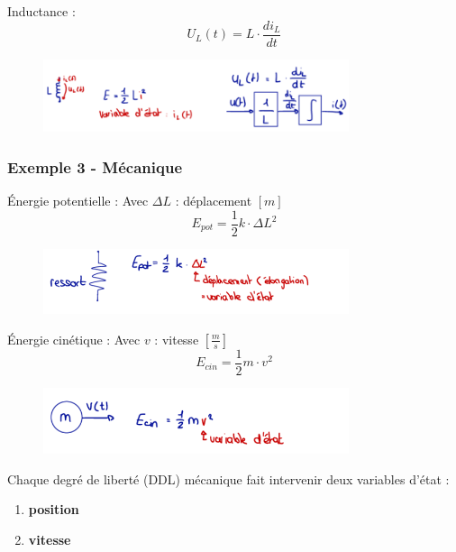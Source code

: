 \documentclass[document.tex]{subfiles}
\begin{document}
Inductance :
\begin{equation}
	U_L(t) = L \cdot \frac{di_L}{dt}
\end{equation}
\begin{figure}[H]
    \centering
    \includegraphics[width=0.8\textwidth]{Include/Figure/5.png}
\end{figure}

\subsubsection{Exemple 3 - Mécanique}

Énergie potentielle : \hfill Avec $\Delta L$ : déplacement $[m]$
\begin{equation}
 	E_{pot}=\frac{1}{2}k \cdot \Delta L^2 
\end{equation}
\begin{figure}[H]
    \centering
    \includegraphics[width=0.8\textwidth]{Include/Figure/6.png}
\end{figure}

Énergie cinétique :	\hfill Avec $v$ : vitesse $[\frac{m}{s}]$
\begin{equation}
	E_{cin}=\frac{1}{2}m \cdot v^2
\end{equation}
\begin{figure}[H]
    \centering
    \includegraphics[width=0.8\textwidth]{Include/Figure/7.png}
\end{figure}

Chaque degré de liberté (DDL) mécanique fait intervenir deux variables
d'état :
\begin{enumerate}
\item \textbf{position}
\item \textbf{vitesse}
\end{enumerate}
\end{document}
